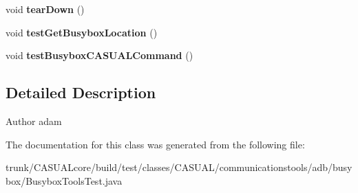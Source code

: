 \begin{DoxyCompactItemize}
\item 
\hypertarget{class_c_a_s_u_a_l_1_1communicationstools_1_1adb_1_1busybox_1_1_busybox_tools_test_a12d381c2f82c841b6dad35ca171b2079}{void {\bfseries tear\-Down} ()}\label{class_c_a_s_u_a_l_1_1communicationstools_1_1adb_1_1busybox_1_1_busybox_tools_test_a12d381c2f82c841b6dad35ca171b2079}

\item 
\hypertarget{class_c_a_s_u_a_l_1_1communicationstools_1_1adb_1_1busybox_1_1_busybox_tools_test_a80165446e3a3945be129e3811358091c}{void {\bfseries test\-Get\-Busybox\-Location} ()}\label{class_c_a_s_u_a_l_1_1communicationstools_1_1adb_1_1busybox_1_1_busybox_tools_test_a80165446e3a3945be129e3811358091c}

\item 
\hypertarget{class_c_a_s_u_a_l_1_1communicationstools_1_1adb_1_1busybox_1_1_busybox_tools_test_ab0a6398a2be2e08a0490b1e96b9f1b87}{void {\bfseries test\-Busybox\-C\-A\-S\-U\-A\-L\-Command} ()}\label{class_c_a_s_u_a_l_1_1communicationstools_1_1adb_1_1busybox_1_1_busybox_tools_test_ab0a6398a2be2e08a0490b1e96b9f1b87}

\end{DoxyCompactItemize}


\subsection{Detailed Description}
\begin{DoxyAuthor}{Author}
adam 
\end{DoxyAuthor}


The documentation for this class was generated from the following file\-:\begin{DoxyCompactItemize}
\item 
trunk/\-C\-A\-S\-U\-A\-Lcore/build/test/classes/\-C\-A\-S\-U\-A\-L/communicationstools/adb/busybox/Busybox\-Tools\-Test.\-java\end{DoxyCompactItemize}

